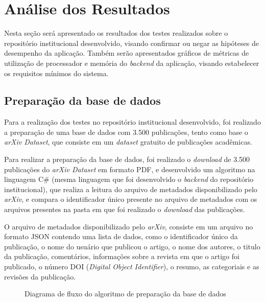 \section{Análise dos Resultados}

Nesta seção será apresentado os resultados dos testes realizados
sobre o repositório institucional desenvolvido, visando confirmar ou negar
as hipóteses de desempenho da aplicação. Também serão apresentados gráficos de
métricas de utilização de processador e memória do \emph{backend} da aplicação,
visando estabelecer os requisitos mínimos do sistema.

\subsection{Preparação da base de dados}

Para a realização dos testes no repositório institucional desenvolvido,
foi realizado a preparação de uma base de dados com 3.500 publicações,
tento como base o \emph{arXiv Dataset}, que consiste em um \emph{dataset}
gratuito de publicações acadêmicas.

Para realizar a preparação da base de dados, foi realizado o \emph{download} de
3.500 publicações do \emph{arXiv Dataset} em formato PDF, e desenvolvido um algoritmo
na linguagem C\# (mesma linguagem que foi desenvolvido o \emph{backend} do repositório
institucional), que realiza a leitura do arquivo de metadados disponibilizado pelo \emph{arXiv},
e compara o identificador único presente no arquivo de metadados com os arquivos presentes
na pasta em que foi realizado o \emph{download} das publicações.

O arquivo de metadados disponibilizado pelo \emph{arXiv}, consiste em um arquivo no formato
JSON contendo uma lista de dados, como o identificador único da publicação, o nome do usuário
que publicou o artigo, o nome dos autores, o titulo da publicação, comentários, informações sobre
a revista em que o artigo foi publicado, o número DOI (\emph{Digital Object Identifier}), o resumo,
as categoriais e as revisões da publicação.

\begin{figure}[H]
    \caption{Diagrama de fluxo do algoritmo de preparação da base de dados}
    \centering
    \label{fig:pseudo-algoritmo}
\end{figure}

